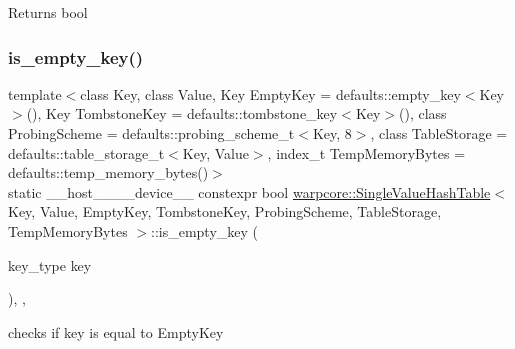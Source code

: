 \begin{DoxyReturn}{Returns}
{\ttfamily bool} 
\end{DoxyReturn}
\mbox{\label{classwarpcore_1_1SingleValueHashTable_a804597a01cdfb417ca451760a9452542}} 
\subsubsection{\texorpdfstring{is\+\_\+empty\+\_\+key()}{is\_empty\_key()}}
{\footnotesize\ttfamily template$<$class Key, class Value, Key Empty\+Key = defaults\+::empty\+\_\+key$<$\+Key$>$(), Key Tombstone\+Key = defaults\+::tombstone\+\_\+key$<$\+Key$>$(), class Probing\+Scheme = defaults\+::probing\+\_\+scheme\+\_\+t$<$\+Key, 8$>$, class Table\+Storage = defaults\+::table\+\_\+storage\+\_\+t$<$\+Key, Value$>$, index\+\_\+t Temp\+Memory\+Bytes = defaults\+::temp\+\_\+memory\+\_\+bytes()$>$ \\
static \+\_\+\+\_\+host\+\_\+\+\_\+\+\_\+\+\_\+device\+\_\+\+\_\+ constexpr bool \hyperlink{classwarpcore_1_1SingleValueHashTable}{warpcore\+::\+Single\+Value\+Hash\+Table}$<$ Key, Value, Empty\+Key, Tombstone\+Key, Probing\+Scheme, Table\+Storage, Temp\+Memory\+Bytes $>$\+::is\+\_\+empty\+\_\+key (\begin{DoxyParamCaption}\item[{key\+\_\+type}]{key }\end{DoxyParamCaption})\hspace{0.3cm}{\ttfamily [inline]}, {\ttfamily [static]}, {\ttfamily [noexcept]}}



checks if {\ttfamily key} is equal to {\ttfamily Empty\+Key} 

